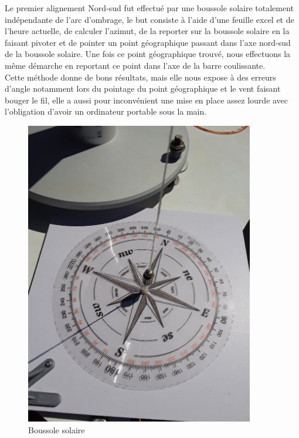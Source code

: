 \documentclass[12pt,a4paper]{article}
\begin{document}
\begin{flushleft}
Le premier alignement Nord-sud fut effectué par une boussole solaire totalement indépendante de l'arc d'ombrage, le but consiste à l'aide d'une feuille excel et de l'heure actuelle, de calculer l'azimut, de la reporter sur la boussole solaire en la faisant pivoter et de pointer un point géographique passant dans l'axe nord-sud de la boussole solaire. Une fois ce point géographique trouvé, nous effectuons la même démarche en reportant ce point dans l'axe de la barre coulissante.\\

Cette méthode donne de bons résultats, mais elle nous expose à des erreurs d'angle notamment lors du pointage du point géographique et le vent faisant bouger le fil, elle a aussi pour inconvénient une mise en place assez lourde avec l'obligation d'avoir un ordinateur portable sous la main.\\	

\begin{figure}[H]
\centering
\includegraphics[width=10cm, angle=-90]{image/montage/5.jpg} 
\caption{Boussole solaire}
\end{figure}


\end{flushleft}
\end{document}
